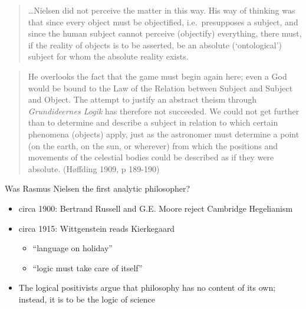 \documentclass[ignorenonframetext, ]{beamer}
\begin{document}
\begin{frame}

  \begin{quote}
    \ldots Nielsen did not perceive the matter in this way. His way of
    thinking was that since every object must be objectified,
    i.e.~presupposes a subject, and since the human subject cannot
    perceive (objectify) everything, there must, if the reality of
    objects is to be asserted, be an absolute (`ontological') subject
    for whom the absolute reality exists.
\end{quote}

\end{frame}

\begin{frame}

  \begin{quote}
    He overlooks the fact that the game must begin again here; even a
    God would be bound to the Law of the Relation between Subject and
    Subject and Object. The attempt to justify an abstract theism
    through \emph{Grundideernes Logik} has therefore not succeeded. We
    could not get further than to determine and describe a subject in
    relation to which certain phenomena (objects) apply, just as the
    astronomer must determine a point (on the earth, on the sun, or
    wherever) from which the positions and movements of the celestial
    bodies could be described as if they were absolute. (Høffding
    1909, p 189-190)
\end{quote}

\end{frame}


\begin{frame}{Was Rasmus Nielsen the first analytic philosopher?}

\begin{itemize}
\item circa 1900: Bertrand Russell and G.E. Moore reject Cambridge
  Hegelianism
\item circa 1915: Wittgenstein reads Kierkegaard
  \begin{itemize}
  \item ``language on holiday''
  \item ``logic must take care of itself''
  \end{itemize}
\item
  The logical positivists argue that philosophy has no content of its
  own; instead, it is to be the logic of science
\end{itemize}
\end{frame}
\end{document}
